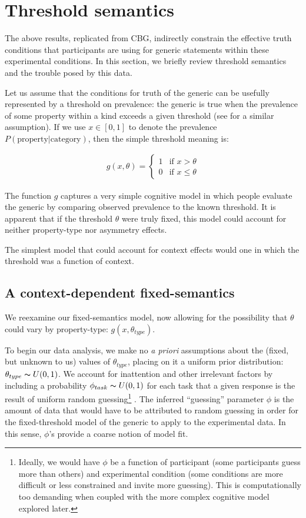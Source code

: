 \documentclass[10pt,letterpaper]{article}
\begin{document}
\section{Threshold semantics}
The above results, replicated from CBG, indirectly constrain the effective truth conditions that participants are using for generic statements within these experimental conditions. In this section, we briefly review threshold semantics and the trouble posed by this data.

Let us assume that the conditions for truth of the generic can be usefully represented by a threshold on prevalence: the generic is true when the prevalence of some property within a kind exceeds a given threshold (see  for a similar assumption). If we use $x\in [0,1]$ to denote the prevalence $P(\text{property}|\text{category})$, then the simple threshold meaning is:

\begin{align}
 g(x, \theta) = \begin{cases}
   1 & \text{if } x > \theta \\
   0       & \text{if } x \leq \theta
  \end{cases}
   \label{eq:ftsem}
\end{align}

The function $g$ captures a very simple cognitive model in which people evaluate the generic by comparing observed prevalence to the known threshold.
It is apparent that if the threshold $\theta$ were truly fixed, this model could account for neither property-type nor asymmetry effects.

The simplest model that could account for context effects would one in which the threshold was a function of context. 


\subsection{A context-dependent fixed-semantics}

We reexamine our fixed-semantics model, now allowing for the possibility that $\theta$ could vary by property-type: $g(x,\theta_{type})$.

To begin our data analysis, we make no \emph{a priori} assumptions about the (fixed, but unknown to us) values of $\theta_{type}$, placing on it a uniform prior distribution: $\theta_{type} \thicksim U(0,1)$. 
We account for inattention and other irrelevant factors by including a probability $\phi_{task}\thicksim U(0,1)$ for each task that a given response is the result of uniform random guessing\footnote{Ideally, we would have $\phi$ be a function of participant (some participants guess more than others) and experimental condition (some conditions are more difficult or less constrained and invite more guessing). This is computationally too demanding when coupled with the more complex cognitive model explored later.}  \cite{LW2014}.
The inferred ``guessing'' parameter $\phi$ is the amount of data that would have to be attributed to random guessing in order for the fixed-threshold model of the generic to apply to the experimental data. In this sense, $\phi$'s provide a coarse notion of model fit. 
\end{document}
